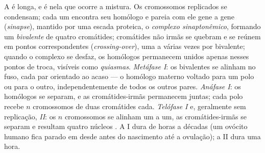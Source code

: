 \begin{proposition}[As fases]\label{prop:b2:meiosis-heredity:stages}
A \emph{} é longa, e é nela que ocorre a mistura. Os
cromossomos replicados se condensam; cada um encontra seu homólogo e
pareia com ele gene a gene (\emph{sinapse}), mantido por uma escada
proteica, o \emph{complexo sinaptonêmico}, formando um
\emph{bivalente} de quatro cromátides; cromátides não irmãs se quebram
e se reúnem em pontos correspondentes (\emph{crossing-over}), uma a
várias vezes por bivalente; quando o complexo se desfaz, os homólogos
permanecem unidos apenas nesses pontos de troca, visíveis como
\emph{quiasmas}. \emph{Metáfase I}: os bivalentes se alinham no fuso,
cada par orientado ao acaso --- o homólogo materno voltado para um
polo ou para o outro, independentemente de todos os outros pares.
\emph{Anáfase I}: os homólogos se separam, e as cromátides-irmãs
permanecem juntas; cada polo recebe $n$ cromossomos de duas
cromátides cada. \emph{Telófase I} e, geralmente sem replicação,
\emph{ II}: os $n$ cromossomos se alinham um a um, as
cromátides-irmãs se separam e resultam quatro núcleos . A
 I dura de horas a décadas (um ovócito humano fica parado em
 desde antes do nascimento até a ovulação); a  II dura
uma hora.
\end{proposition}

